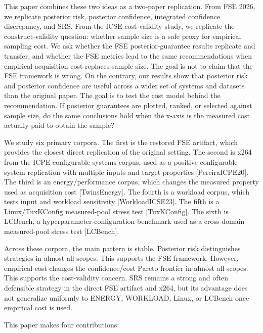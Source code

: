 \documentclass[smallcondensed]{svjour3}
\begin{document}
This paper combines these two ideas as a two-paper replication. From FSE
2026, we replicate posterior risk, posterior confidence, integrated
confidence discrepancy, and SRS. From the ICSE cost-validity study, we
replicate the construct-validity question: whether sample size is a safe
proxy for empirical sampling cost. We ask whether the FSE
posterior-guarantee results replicate and transfer, and whether the FSE
metrics lead to the same recommendations when empirical acquisition cost
replaces sample size. The goal is not to claim that the FSE framework is
wrong. On the contrary, our results show that posterior risk and
posterior confidence are useful across a wider set of systems and
datasets than the original paper. The goal is to test the cost model
behind the recommendation. If posterior guarantees are plotted, ranked,
or selected against sample size, do the same conclusions hold when the
x-axis is the measured cost actually paid to obtain the sample?

We study six primary corpora. The first is the restored FSE artifact,
which provides the closest direct replication of the original setting.
The second is x264 from the ICPE configurable-systems corpus, used as a
positive configurable-system replication with multiple inputs and target
properties {[}PereiraICPE20{]}. The third is an energy/performance
corpus, which changes the measured property used as acquisition cost
{[}TwinsEnergy{]}. The fourth is a workload corpus, which tests input
and workload sensitivity {[}WorkloadICSE23{]}. The fifth is a
Linux/TuxKConfig measured-pool stress test {[}TuxKConfig{]}. The sixth
is LCBench, a hyperparameter-configuration benchmark used as a
cross-domain measured-pool stress test {[}LCBench{]}.

Across these corpora, the main pattern is stable. Posterior risk
distinguishes strategies in almost all scopes. This supports the FSE
framework. However, empirical cost changes the confidence/cost Pareto
frontier in almost all scopes. This supports the cost-validity concern.
SRS remains a strong and often defensible strategy in the direct FSE
artifact and x264, but its advantage does not generalize uniformly to
ENERGY, WORKLOAD, Linux, or LCBench once empirical cost is used.

This paper makes four contributions:
\end{document}
